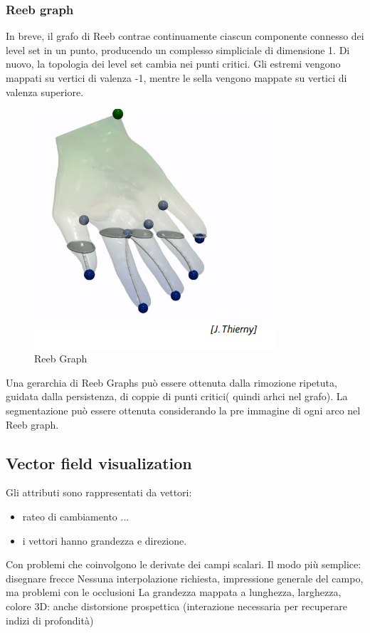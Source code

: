 \subsubsection{Reeb graph}
In breve, il grafo di Reeb contrae continuamente ciascun componente connesso dei level set in un punto, producendo un complesso simpliciale di dimensione 1. Di nuovo, la topologia dei level set cambia nei punti critici. Gli estremi vengono mappati su vertici di valenza -1, mentre le sella vengono mappate su vertici di valenza superiore.
\begin{figure}[H]
    \centering
    \includegraphics[width=0.8\textwidth]{images/ReebGraph.png} 
    \caption{Reeb Graph}
    \label{fig:immagine}
\end{figure}
Una gerarchia di Reeb Graphs può essere ottenuta dalla rimozione ripetuta, guidata dalla persistenza, di coppie di punti critici( quindi arhci nel grafo).
La segmentazione può essere ottenuta considerando la pre immagine di ogni arco nel Reeb graph.
\subsection{Vector field visualization}
Gli attributi sono rappresentati da vettori:
\begin{itemize}
    \item rateo di cambiamento ... 
    \item i vettori hanno grandezza e direzione.
\end{itemize}
Con problemi che coinvolgono le derivate dei campi scalari.
Il modo più semplice: disegnare frecce
Nessuna interpolazione richiesta, impressione generale del campo, ma problemi con le occlusioni
La grandezza mappata a lunghezza, larghezza, colore
3D: anche distorsione prospettica (interazione necessaria per recuperare indizi di profondità)

